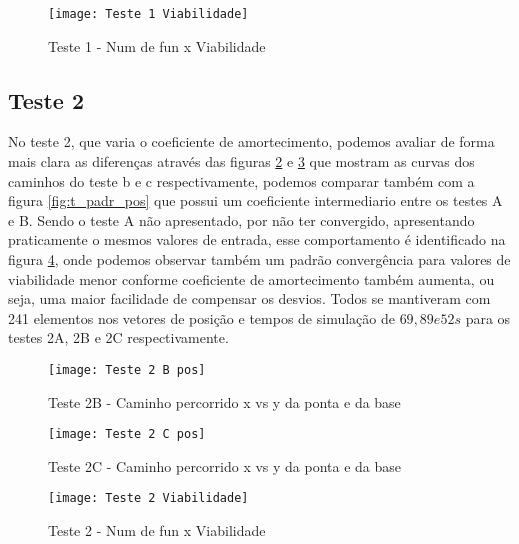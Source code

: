 \begin{figure}[!htb]
    \begin{center}
    \caption{Teste 1 - Num de fun x Viabilidade}
    \texttt{[image: Teste 1 Viabilidade]}
    \label{fig:t_1_viab}
    \end{center}
\end{figure}

\subsection{Teste 2}
No teste 2, que varia o coeficiente de amortecimento, podemos avaliar de forma mais clara as diferenças através das figuras
\ref{fig:t_2b_pos} e \ref{fig:t_2c_pos} que mostram as curvas dos caminhos do teste b e c respectivamente, podemos comparar também
com a figura \ref{fig:t_padr_pos} que possui um coeficiente intermediario entre os testes A e B.
Sendo o teste A não apresentado, por não ter convergido, apresentando praticamente o mesmos valores de entrada, esse comportamento
é identificado na figura \ref{fig:t_2_viab}, onde podemos observar também um padrão convergência para valores de viabilidade menor conforme
coeficiente de amortecimento também aumenta, ou seja, uma maior facilidade de compensar os desvios.
Todos se mantiveram com 241 elementos nos vetores de posição e tempos de simulação de $69, 89 e 52 s$ para os testes 2A, 2B e 2C respectivamente.

\begin{figure}[!htb]
    \begin{center}
    \caption{Teste 2B - Caminho percorrido x vs y da ponta e da base}
    \texttt{[image: Teste 2 B pos]}
    \label{fig:t_2b_pos}
    \end{center}
\end{figure}

\begin{figure}[!htb]
    \begin{center}
    \caption{Teste 2C - Caminho percorrido x vs y da ponta e da base}
    \texttt{[image: Teste 2 C pos]}
    \label{fig:t_2c_pos}
    \end{center}
\end{figure}

\begin{figure}[!htb]
    \begin{center}
    \caption{Teste 2 - Num de fun x Viabilidade}
    \texttt{[image: Teste 2 Viabilidade]}
    \label{fig:t_2_viab}
    \end{center}
\end{figure}

